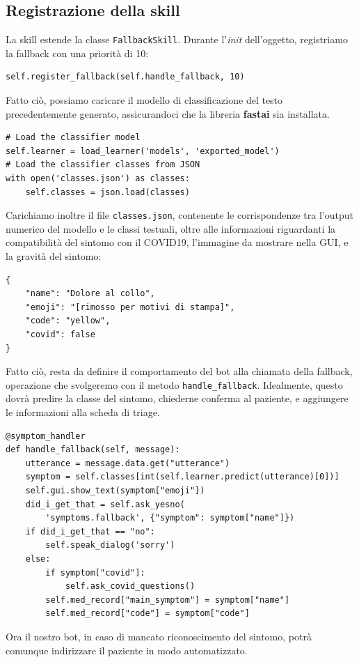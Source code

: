 \subsection{Registrazione della skill}
La skill estende la classe \texttt{FallbackSkill}. Durante l'\textit{init} dell'oggetto, registriamo la fallback con una priorità di 10:
\begin{verbatim}
self.register_fallback(self.handle_fallback, 10)
\end{verbatim}
Fatto ciò, possiamo caricare il modello di classificazione del testo precedentemente generato, assicurandoci che la libreria \textbf{fastai} sia installata.
\begin{verbatim}
# Load the classifier model
self.learner = load_learner('models', 'exported_model')
# Load the classifier classes from JSON
with open('classes.json') as classes:
    self.classes = json.load(classes)
\end{verbatim}
Carichiamo inoltre il file \texttt{classes.json}, contenente le corrispondenze tra l'output numerico del modello e le classi testuali, oltre alle informazioni riguardanti la compatibilità del sintomo con il COVID19, l'immagine da mostrare nella GUI, e la gravità del sintomo:
\begin{verbatim}
{
    "name": "Dolore al collo",
    "emoji": "[rimosso per motivi di stampa]",
    "code": "yellow",
    "covid": false
}
\end{verbatim}
Fatto ciò, resta da definire il comportamento del bot alla chiamata della fallback, operazione che svolgeremo con il metodo \texttt{handle\_fallback}.
Idealmente, questo dovrà predire la classe del sintomo, chiederne conferma al paziente, e aggiungere le informazioni alla scheda di triage.
\begin{verbatim}
@symptom_handler
def handle_fallback(self, message):
    utterance = message.data.get("utterance")
    symptom = self.classes[int(self.learner.predict(utterance)[0])]
    self.gui.show_text(symptom["emoji"])
    did_i_get_that = self.ask_yesno(
        'symptoms.fallback', {"symptom": symptom["name"]})
    if did_i_get_that == "no":
        self.speak_dialog('sorry')
    else:
        if symptom["covid"]:
            self.ask_covid_questions()
        self.med_record["main_symptom"] = symptom["name"]
        self.med_record["code"] = symptom["code"]
\end{verbatim}
Ora il nostro bot, in caso di mancato riconoscimento del sintomo, potrà comunque indirizzare il paziente in modo automatizzato.
